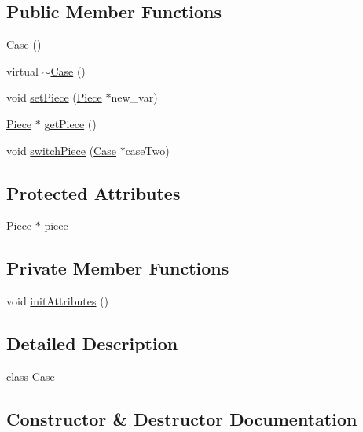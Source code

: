 \subsection*{Public Member Functions}
\begin{DoxyCompactItemize}
\item 
\hyperlink{class_case_a14237e17aab1829965adab76b747db6c}{Case} ()
\item 
virtual \hyperlink{class_case_ab004564aae3e15db0c7fd5dde0b4c379}{$\sim$\+Case} ()
\item 
void \hyperlink{class_case_aaa0ce6e0cfcb0fc6bf38c7be1a82b1e0}{set\+Piece} (\hyperlink{class_piece}{Piece} $\ast$new\+\_\+var)
\item 
\hyperlink{class_piece}{Piece} $\ast$ \hyperlink{class_case_af7cd37da62062eb606a3b439e131c937}{get\+Piece} ()
\item 
void \hyperlink{class_case_a3a1a33aeb2401ff0f08dfb89b63832fa}{switch\+Piece} (\hyperlink{class_case}{Case} $\ast$case\+Two)
\end{DoxyCompactItemize}
\subsection*{Protected Attributes}
\begin{DoxyCompactItemize}
\item 
\hyperlink{class_piece}{Piece} $\ast$ \hyperlink{class_case_aecf7c05bfb4eaf8332f9c556319993a3}{piece}
\end{DoxyCompactItemize}
\subsection*{Private Member Functions}
\begin{DoxyCompactItemize}
\item 
void \hyperlink{class_case_a975dfe51150f130269224046566ee774}{init\+Attributes} ()
\end{DoxyCompactItemize}


\subsection{Detailed Description}
class \hyperlink{class_case}{Case} 

\subsection{Constructor \& Destructor Documentation}
